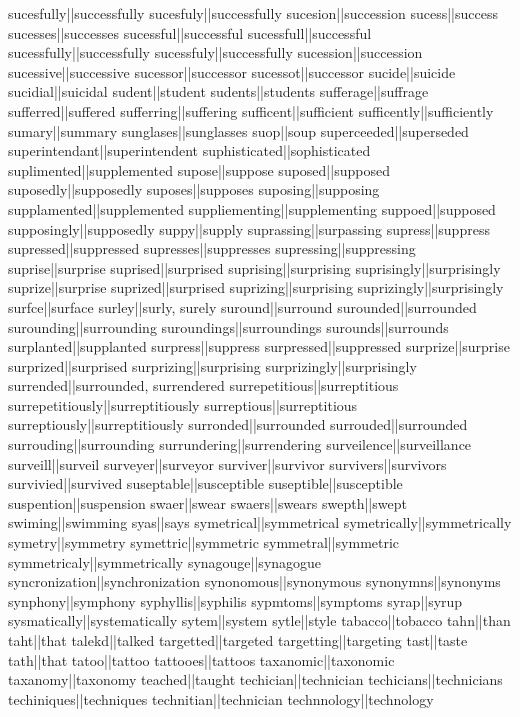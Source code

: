 sucesfully||successfully
sucesfuly||successfully
sucesion||succession
sucess||success
sucesses||successes
sucessful||successful
sucessfull||successful
sucessfully||successfully
sucessfuly||successfully
sucession||succession
sucessive||successive
sucessor||successor
sucessot||successor
sucide||suicide
sucidial||suicidal
sudent||student
sudents||students
sufferage||suffrage
sufferred||suffered
sufferring||suffering
sufficent||sufficient
sufficently||sufficiently
sumary||summary
sunglases||sunglasses
suop||soup
superceeded||superseded
superintendant||superintendent
suphisticated||sophisticated
suplimented||supplemented
supose||suppose
suposed||supposed
suposedly||supposedly
suposes||supposes
suposing||supposing
supplamented||supplemented
suppliementing||supplementing
suppoed||supposed
supposingly||supposedly
suppy||supply
suprassing||surpassing
supress||suppress
supressed||suppressed
supresses||suppresses
supressing||suppressing
suprise||surprise
suprised||surprised
suprising||surprising
suprisingly||surprisingly
suprize||surprise
suprized||surprised
suprizing||surprising
suprizingly||surprisingly
surfce||surface
surley||surly, surely
suround||surround
surounded||surrounded
surounding||surrounding
suroundings||surroundings
surounds||surrounds
surplanted||supplanted
surpress||suppress
surpressed||suppressed
surprize||surprise
surprized||surprised
surprizing||surprising
surprizingly||surprisingly
surrended||surrounded, surrendered
surrepetitious||surreptitious
surrepetitiously||surreptitiously
surreptious||surreptitious
surreptiously||surreptitiously
surronded||surrounded
surrouded||surrounded
surrouding||surrounding
surrundering||surrendering
surveilence||surveillance
surveill||surveil
surveyer||surveyor
surviver||survivor
survivers||survivors
survivied||survived
suseptable||susceptible
suseptible||susceptible
suspention||suspension
swaer||swear
swaers||swears
swepth||swept
swiming||swimming
syas||says
symetrical||symmetrical
symetrically||symmetrically
symetry||symmetry
symettric||symmetric
symmetral||symmetric
symmetricaly||symmetrically
synagouge||synagogue
syncronization||synchronization
synonomous||synonymous
synonymns||synonyms
synphony||symphony
syphyllis||syphilis
sypmtoms||symptoms
syrap||syrup
sysmatically||systematically
sytem||system
sytle||style
tabacco||tobacco
tahn||than
taht||that
talekd||talked
targetted||targeted
targetting||targeting
tast||taste
tath||that
tatoo||tattoo
tattooes||tattoos
taxanomic||taxonomic
taxanomy||taxonomy
teached||taught
techician||technician
techicians||technicians
techiniques||techniques
technitian||technician
technnology||technology
